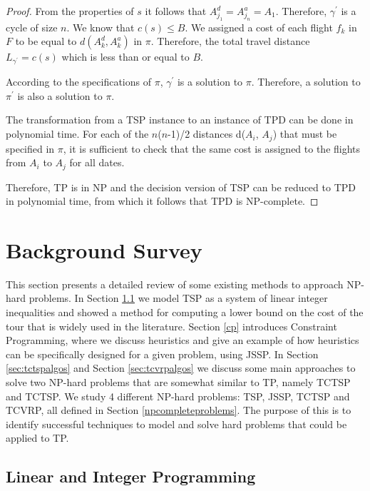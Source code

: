 \documentclass{mprop}
\theoremstyle{definition}
\begin{document}
\begin{proof}
From the properties of $s$ it follows that $A^{d}_{j_{1}} = A^{a}_{j_{n}} = A_{1}$. Therefore, $\gamma^{\prime}$ is a cycle of size $n$. We know that $c(s) \leq B$. We assigned a cost of each flight $f_{k}$ in $F$ to be equal to $d(A^{d}_{k}, A^{a}_{k})$ in $\pi$. Therefore, the total travel distance $L_{\gamma^{\prime}} = c(s)$ which is less than or equal to $B$.

According to the specifications of $\pi$, $\gamma^{\prime}$ is a solution to $\pi$. Therefore, a solution to $\pi^{\prime}$ is also a solution to $\pi$.

The transformation from a TSP instance to an instance of TPD can be done in polynomial time. For each of the $n$($n$-1)/2 distances d($A_{i}$, $A_{j}$) that must be specified in $\pi$, it is sufficient to check that the same cost is assigned to the flights from $A_{i}$ to $A_{j}$ for all dates.

Therefore, TP is in NP and the decision version of TSP can be reduced to TPD in polynomial time, from which it follows that TPD is NP-complete.

\end{proof}

\section{Background Survey}
\label{sec:existingwork}
This section presents a detailed review of some existing methods to approach NP-hard problems. In Section \ref{ip} we model TSP as a system of linear integer inequalities and showed a method for computing a lower bound on the cost of the tour that is widely used in the literature. Section \ref{cp} introduces Constraint Programming, where we discuss heuristics and give an example of how heuristics can be specifically designed for a given problem, using JSSP. In Section \ref{sec:tctspalgos} and Section \ref{sec:tcvrpalgos} we discuss some main approaches to solve two NP-hard problems that are somewhat similar to TP, namely TCTSP and TCTSP.
We study 4 different NP-hard problems: TSP, JSSP, TCTSP and TCVRP, all defined in Section \ref{npcompleteproblems}. The purpose of this is to identify successful techniques to model and solve hard problems that could be applied to TP.

\subsection{Linear and Integer Programming}
\label{ip}
\end{document}
